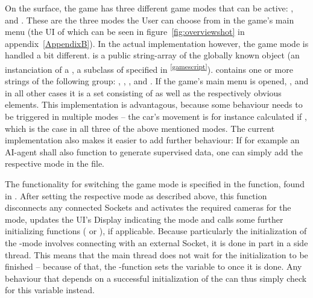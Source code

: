 On the surface, the game has three different game modes that can be active: ,  and . These are the three modes the User can choose from in the game's main menu (the UI of which can be seen in figure~\ref{fig:overviewshot} in appendix~\ref{AppendixB}). In the actual implementation however, the game mode is handled a bit different.  is a public string-array of the globally known object  (an instanciation of a , a subclass of  specified in \textsuperscript{\ref{gamescript}}).  contains one or more strings of the following group: , , ,  and . If the game's main menu is opened, , and in all other cases it is a set consisting of  as well as the respectively obvious elements. This implementation is advantagous, because some behaviour needs to be triggered in multiple modes -- the car's movement is for instance calculated if , which is the case in all three of the above mentioned modes. The current implementation also makes it easier to add further behaviour: If for example an AI-agent shall also function to generate supervised data, one can simply add the respective mode in the  file.

The functionality for switching the game mode is specified in the  function, found in . After setting the respective mode as described above, this function disconnects any connected Sockets and  activates the required cameras for the mode, updates the UI's Display indicating the mode and calls some further initializing functions ( or ), if applicable. Because particularly the initialization of the -mode involves connecting with an external Socket, it is done in part in a side thread. This means that the main thread does not wait for the initialization to be finished -- because of that, the -function sets the variable  to  once it is done. Any behaviour that depends on a successful initialization of the can thus simply check for this variable instead.


